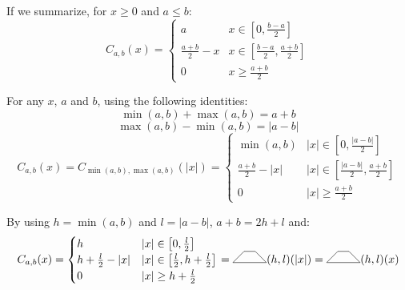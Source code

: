 \documentclass[a4paper,10pt]{article}
\newcommand\SymTrapezoid{\begin{tikzpicture}%
        \draw (0,0) -- (3em,0) -- (2em,1em) -- (1em,1em) -- cycle;
\end{tikzpicture}}
\newcommand\Trapezoid[2]{\SymTrapezoid(#1,#2)}%
\begin{document}
If we summarize, for $x \ge 0$ and $a \le b$:
\[ C_{a,b}(x) = \begin{cases}
    a & x \in \left[ 0, \frac{b-a}{2} \right] \\
    \frac{a+b}{2} - x & x \in \left[ \frac{b-a}{2}, \frac{a+b}{2} \right] \\
    0 & x \ge \frac{a+b}{2}
\end{cases} \]

For any $x$, $a$ and $b$, using the following identities:
\[ \min(a,b) + \max(a,b) = a + b \]
\[ \max(a,b) - \min(a,b) = |a - b| \]
\[ C_{a,b}(x) = C_{\min(a,b),\max(a,b)}(|x|) = \begin{cases}
    \min(a,b) & |x| \in \left[0, \frac{|a-b|}{2} \right] \\    
    \frac{a+b}{2} - |x| & |x| \in \left[ \frac{|a-b|}{2}, \frac{a+b}{2} \right] \\
    0 & |x| \ge \frac{a+b}{2}
\end{cases} \]

By using $h = \min(a,b)$ and $l = |a-b|$, $a+b=2h+l$ and:
\[ C_{a,b}(x) = \begin{cases}
    h & |x| \in \left[0, \frac{l}{2} \right] \\    
    h+\frac{l}{2} - |x| & |x| \in \left[ \frac{l}{2}, h+\frac{l}{2} \right] \\
    0 & |x| \ge h+\frac{l}{2}
\end{cases} = \Trapezoid{h}{l}(|x|) = \Trapezoid{h}{l}(x) \]
\end{document}
